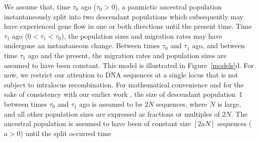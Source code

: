 \documentclass[11pt]{article}
\begin{document}
We assume that, time $\tau_0$ ago ($\tau_0>0$), a panmictic ancestral population instantaneously split into  
two descendant populations which subsequently may have experienced 
gene flow in one or both directions until the present time. Time $\tau_1$ ago ($0<\tau_1<\tau_0$), the population sizes and migration rates may have undergone an instantaneous change. Between times
$\tau_0$ and $\tau_1$ ago, and between time $\tau_1$ ago and the present, the 
migration rates and population sizes are assumed to have been constant.
This model is illustrated in Figure~\ref{models}d.
For now, we restrict our attention to DNA sequences at a single locus that is not subject to intralocus recombination. 
For mathematical convenience and for the sake of consistency with our earlier work 
\citep{Herbots2008,Herbots2012,Herbots2015,Costa2017}, the size of descendant population~1 between times $\tau_0$ and $\tau_1$ ago is assumed to be 
$2N$ sequences, where $N$ is large, and all other population sizes are expressed as fractions or multiples of $2N$. The ancestral population is assumed to have been of constant size $[2aN]$ sequences ($a>0$) until the split occurred time 
\end{document}
